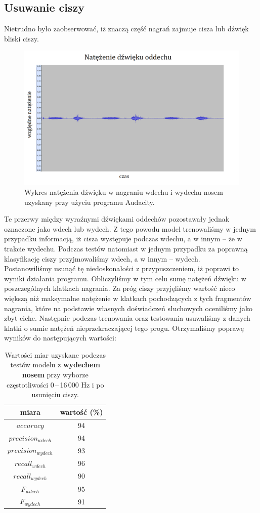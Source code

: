 \documentclass[polish]{article}
\begin{document}
\subsection{Usuwanie ciszy}
Nietrudno było zaobserwować, iż znaczą część nagrań zajmuje cisza lub dźwięk bliski ciszy.
\begin{figure}[H]
	\centering
	\includegraphics[width=13cm]{natezenie_wydech_nosem}
	\caption{Wykres natężenia dźwięku w nagraniu wdechu i wydechu nosem uzyskany przy użyciu programu Audacity.}
\end{figure}
Te przerwy między wyraźnymi dźwiękami oddechów pozostawały jednak oznaczone jako wdech lub wydech. Z tego powodu model trenowaliśmy w jednym przypadku informacją, iż cisza występuje podczas wdechu, a w innym -- że w trakcie wydechu. Podczas testów natomiast w jednym przypadku za poprawną klasyfikację ciszy przyjmowaliśmy wdech, a w innym -- wydech. \\
\indent Postanowiliśmy usunąć tę niedoskonałości z przypuszczeniem, iż poprawi to wyniki działania programu. Obliczyliśmy w tym celu sumę natężeń dźwięku w poszczególnych klatkach nagrania. Za próg ciszy przyjęliśmy wartość nieco większą niż maksymalne natężenie w klatkach pochodzących z tych fragmentów nagrania, które na podstawie własnych doświadczeń słuchowych oceniliśmy jako zbyt ciche. Następnie podczas trenowania oraz testowania usuwaliśmy z danych klatki o sumie natężeń nieprzekraczającej tego progu. Otrzymaliśmy poprawę wyników do następujących wartości:
\begin{table}[H]
\caption{Wartości miar uzyskane podczas testów modelu z \textbf{wydechem nosem} przy wyborze częstotliwości 0\,--\,16\,000 \unit{Hz} i po usunięciu ciszy.}
\begin{center}
\begin{tabular}{c | c}
	miara & wartość (\%) \\
	\hline
	$accuracy$ & 94 \\
	$precision_{wdech}$ & 94 \\
	$precision_{wydech}$ & 93 \\
	$recall_{wdech}$ & 96 \\
	$recall_{wydech}$ & 90 \\
	$F_{wdech}$ & 95 \\
	$F_{wydech}$ & 91
\end{tabular}
\end{center}
\end{table}
\end{document}
